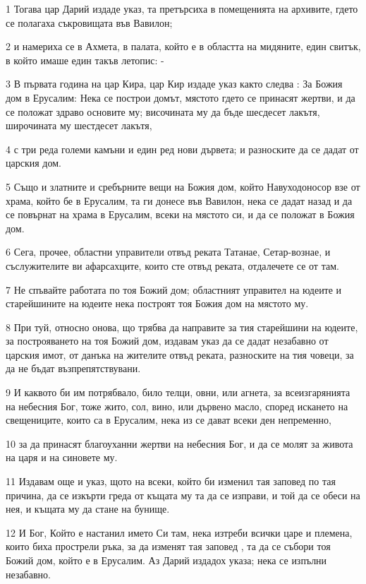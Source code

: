 \par 1 Тогава цар Дарий издаде указ, та претърсиха в помещенията на архивите, гдето се полагаха съкровищата във Вавилон;
\par 2 и намериха се в Ахмета, в палата, който е в областта на мидяните, един свитък, в който имаше един такъв летопис: -
\par 3 В първата година на цар Кира, цар Кир издаде указ както следва : За Божия дом в Ерусалим: Нека се построи домът, мястото гдето се принасят жертви, и да се положат здраво основите му; височината му да бъде шесдесет лакътя, широчината му шестдесет лакътя,
\par 4 с три реда големи камъни и един ред нови дървета; и разноските да се дадат от царския дом.
\par 5 Също и златните и сребърните вещи на Божия дом, който Навуходоносор взе от храма, който бе в Ерусалим, та ги донесе във Вавилон, нека се дадат назад и да се повърнат на храма в Ерусалим, всеки на мястото си, и да се положат в Божия дом.
\par 6 Сега, прочее, областни управители отвъд реката Татанае, Сетар-вознае, и съслужителите ви афарсахците, които сте отвъд реката, отдалечете се от там.
\par 7 Не спъвайте работата по тоя Божий дом; областният управител на юдеите и старейшините на юдеите нека построят тоя Божия дом на мястото му.
\par 8 При туй, относно онова, що трябва да направите за тия старейшини на юдеите, за построяването на тоя Божий дом, издавам указ да се дадат незабавно от царския имот, от данъка на жителите отвъд реката, разноските на тия човеци, за да не бъдат възпрепятствувани.
\par 9 И каквото би им потрябвало, било телци, овни, или агнета, за всеизгарянията на небесния Бог, тоже жито, сол, вино, или дървено масло, според искането на свещениците, които са в Ерусалим, нека из се дават всеки ден непременно,
\par 10 за да принасят благоуханни жертви на небесния Бог, и да се молят за живота на царя и на синовете му.
\par 11 Издавам още и указ, щото на всеки, който би изменил тая заповед по тая причина, да се изкърти греда от къщата му та да се изправи, и той да се обеси на нея, и къщата му да стане на бунище.
\par 12 И Бог, Който е настанил името Си там, нека изтреби всички царе и племена, които биха прострели ръка, за да изменят тая заповед , та да се събори тоя Божий дом, който е в Ерусалим. Аз Дарий издадох указа; нека се изпълни незабавно.
